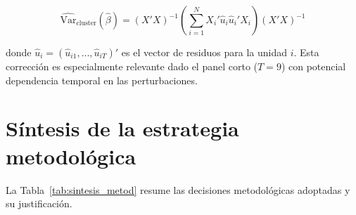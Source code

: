 \begin{equation}
  \widehat{\text{Var}}_{\text{cluster}}(\hat{\beta}) =
  (X'X)^{-1}
  \left(\sum_{i=1}^{N} X_i' \hat{u}_i \hat{u}_i' X_i\right)
  (X'X)^{-1}
  \label{eq:cluster_se}
\end{equation}

donde $\hat{u}_i = (\hat{u}_{i1}, \ldots, \hat{u}_{iT})'$ es el vector de
residuos para la unidad $i$. Esta corrección es especialmente relevante dado el
panel corto ($T=9$) con potencial dependencia temporal en las perturbaciones.

\section{Síntesis de la estrategia metodológica}

La Tabla~\ref{tab:sintesis_metod} resume las decisiones metodológicas adoptadas
y su justificación.

